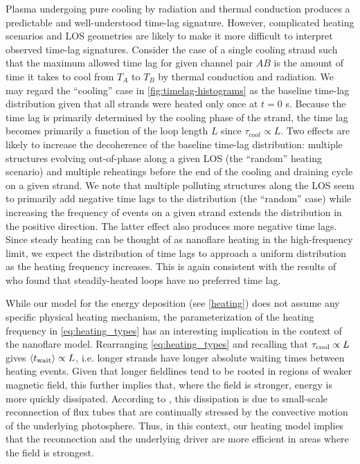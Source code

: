 Plasma undergoing pure cooling by radiation and thermal conduction produces a predictable and well-understood time-lag signature. However, complicated heating scenarios and LOS geometries are likely to make it more difficult to interpret observed time-lag signatures. Consider the case of a single cooling strand such that the maximum allowed time lag for given channel pair $AB$ is the amount of time it takes to cool from $T_A$ to $T_B$ by thermal conduction and radiation. We may regard the ``cooling'' case in \autoref{fig:timelag-histograms} as the baseline time-lag distribution given that all strands were heated only once at $t=0$ s. Because the time lag is primarily determined by the cooling phase of the strand, the time lag becomes primarily a function of the loop length $L$ since $\tau_{cool}\propto L$. Two effects are likely to increase the decoherence of the baseline time-lag distribution: multiple structures evolving out-of-phase along a given LOS (the ``random'' heating scenario) and multiple reheatings before the end of the cooling and draining cycle on a given strand. We note that multiple polluting structures along the LOS seem to primarily add negative time lags to the distribution (the ``random'' case) while increasing the frequency of events on a given strand extends the distribution in the positive direction. The latter effect also produces more negative time lags. Since steady heating can be thought of as nanoflare heating in the high-frequency limit, we expect the distribution of time lags to approach a uniform distribution as the heating frequency increases. This is again consistent with the results of \citet{viall_signatures_2016} who found that steadily-heated loops have no preferred time lag.

While our model for the energy deposition (see \autoref{heating}) does not assume any specific physical heating mechanism, the parameterization of the heating frequency in \autoref{eq:heating_types} has an interesting implication in the context of the \citet{parker_nanoflares_1988} nanoflare model. Rearranging \autoref{eq:heating_types} and recalling that $\tau_\textup{cool}\propto L$ gives $\langle t_{\textup{wait}}\rangle\propto L$, i.e. longer strands have longer absolute waiting times between heating events. Given that longer fieldlines tend to be rooted in regions of weaker magnetic field, this further implies that, where the field is stronger, energy is more quickly dissipated. According to \citet{parker_nanoflares_1988}, this dissipation is due to small-scale reconnection of flux tubes that are continually stressed by the convective motion of the underlying photosphere. Thus, in this context, our heating model implies that the reconnection and the underlying driver are more efficient in areas where the field is strongest.

